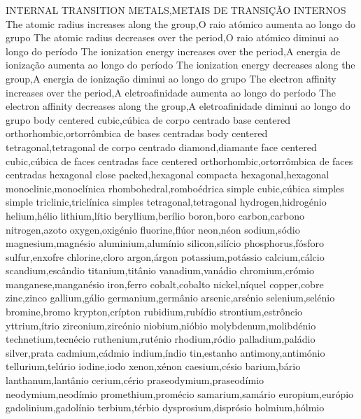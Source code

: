 INTERNAL TRANSITION METALS,METAIS DE TRANSI\c{C}\~{A}O INTERNOS
The atomic radius increases along the group,O raio at\'{o}mico aumenta ao longo do grupo
The atomic radius decreases over the period,O raio at\'{o}mico diminui ao longo do per\'{i}odo
The ionization energy increases over the period,A energia de ioniza\c{c}\~{a}o aumenta ao longo do per\'{i}odo
The ionization energy decreases along the group,A energia de ioniza\c{c}\~{a}o diminui ao longo do grupo
The electron affinity increases over the period,A eletroafinidade aumenta ao longo do per\'{i}odo
The electron affinity decreases along the group,A eletroafinidade diminui ao longo do grupo
body centered cubic,c\'{u}bica de corpo centrado
base centered orthorhombic,ortorr\^{o}mbica de bases centradas
body centered tetragonal,tetragonal de corpo centrado
diamond,diamante
face centered cubic,c\'{u}bica de faces centradas
face centered orthorhombic,ortorr\^{o}mbica de faces centradas
hexagonal close packed,hexagonal compacta
hexagonal,hexagonal
monoclinic,monocl\'{i}nica
rhombohedral,rombo\'{e}drica
simple cubic,c\'{u}bica simples
simple triclinic,tricl\'{i}nica simples
tetragonal,tetragonal
hydrogen,hidrog\'{e}nio
helium,h\'{e}lio
lithium,l\'{i}tio
beryllium,ber\'{i}lio
boron,boro
carbon,carbono
nitrogen,azoto
oxygen,oxig\'{e}nio
fluorine,fl\'{u}or
neon,n\'{e}on
sodium,s\'{o}dio
magnesium,magn\'{e}sio
aluminium,alum\'{i}nio
silicon,sil\'{i}cio
phosphorus,f\'{o}sforo
sulfur,enxofre
chlorine,cloro
argon,\'{a}rgon
potassium,pot\'{a}ssio
calcium,c\'{a}lcio
scandium,esc\^{a}ndio
titanium,tit\^{a}nio
vanadium,van\'{a}dio
chromium,cr\'{o}mio
manganese,mangan\'{e}sio
iron,ferro
cobalt,cobalto
nickel,n\'{i}quel
copper,cobre
zinc,zinco
gallium,g\'{a}lio
germanium,germ\^{a}nio
arsenic,ars\'{e}nio
selenium,sel\'{e}nio
bromine,bromo
krypton,cr\'{i}pton
rubidium,rub\'{i}dio
strontium,estr\^{o}ncio
yttrium,\'{i}trio
zirconium,zirc\'{o}nio
niobium,ni\'{o}bio
molybdenum,molibd\'{e}nio
technetium,tecn\'{e}cio
ruthenium,rut\'{e}nio
rhodium,r\'{o}dio
palladium,pal\'{a}dio
silver,prata
cadmium,c\'{a}dmio
indium,\'{i}ndio
tin,estanho
antimony,antim\'{o}nio
tellurium,tel\'{u}rio
iodine,iodo
xenon,x\'{e}non
caesium,c\'{e}sio
barium,b\'{a}rio
lanthanum,lant\^{a}nio
cerium,c\'{e}rio
praseodymium,praseod\'{i}mio
neodymium,neod\'{i}mio
promethium,prom\'{e}cio
samarium,sam\'{a}rio
europium,eur\'{o}pio
gadolinium,gadol\'{i}nio
terbium,t\'{e}rbio
dysprosium,dispr\'{o}sio
holmium,h\'{o}lmio
